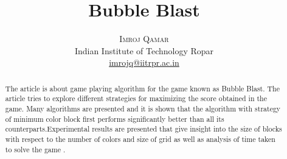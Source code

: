\documentclass[twoside]{article}
\title{\vspace{-15mm}\fontsize{24pt}{10pt}\selectfont\textbf{Bubble Blast}} %
\author{
\large
\textsc{Imroj Qamar}\\%
\normalsize Indian Institute of Technology Ropar \\ %
\normalsize \href{mailto:imrojq@iitrpr.ac.in}{imrojq@iitrpr.ac.in} %
\vspace{-5mm}
}
\date{}
\begin{document}
\maketitle %

\thispagestyle{fancy} %


\begin{abstract}
The article is about game playing algorithm for the game known as Bubble Blast.
The article tries to explore different strategies for maximizing the score obtained in the game.
Many algorithms are presented and it is shown that the algorithm with strategy of minimum color block first performs significantly better than all its counterparts.Experimental results are presented that give insight into the size of blocks with respect to the number of colors and size of grid as well as analysis of time taken to solve the game .


\end{abstract}

\end{document}
